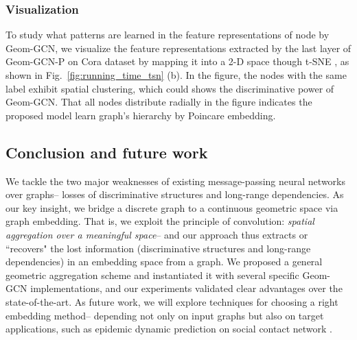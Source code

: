 \documentclass{article} \usepackage{iclr2020_conference,times}
\begin{document}
\subsubsection{Visualization}
\vspace{-1mm}
To study what patterns are learned in the feature representations of node by Geom-GCN, we visualize the feature representations extracted by the last layer of Geom-GCN-P on Cora dataset by mapping it into a 2-D space though t-SNE \citep{maaten2008visualizing}, as shown in Fig.~\ref{fig:running_time_tsn} (b).
In the figure, the nodes with the same label exhibit spatial clustering, which could shows the discriminative power of Geom-GCN. 
That all nodes distribute radially in the figure indicates the proposed model learn graph's hierarchy by Poincare embedding.

\vspace{-1mm}
\subsection{Conclusion and future work}
\vspace{-1mm}
We tackle the two major weaknesses of existing message-passing neural networks over graphs-- losses of discriminative structures and long-range dependencies. 
As our key insight, we bridge a discrete graph to a continuous geometric space via graph embedding.
That is, we exploit the principle of convolution: \emph{spatial aggregation over a meaningful space}-- and our approach thus extracts or ``recovers" the lost information (discriminative structures and long-range dependencies) in an embedding space from a graph.
We proposed a general geometric aggregation scheme and instantiated it with several specific Geom-GCN implementations, and our experiments validated clear advantages over the state-of-the-art.
As future work, we will explore techniques for choosing a right embedding method-- depending not only on input graphs but also on target applications, such as epidemic dynamic prediction on social contact network \citep{DBLP:journals/pami/YangPCLX17,pei2018group}. 

\vspace{-1mm}
\end{document}
